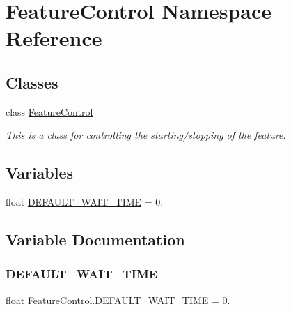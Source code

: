 \hypertarget{namespaceFeatureControl}{}\section{Feature\+Control Namespace Reference}
\label{namespaceFeatureControl}
\subsection*{Classes}
\begin{DoxyCompactItemize}
\item 
class \hyperlink{classFeatureControl_1_1FeatureControl}{Feature\+Control}
\begin{DoxyCompactList}\small\item\em This is a class for controlling the starting/stopping of the feature. \end{DoxyCompactList}\end{DoxyCompactItemize}
\subsection*{Variables}
\begin{DoxyCompactItemize}
\item 
float \hyperlink{namespaceFeatureControl_aeebd4e13e6a3a0dde7d720af530ae36d}{D\+E\+F\+A\+U\+L\+T\+\_\+\+W\+A\+I\+T\+\_\+\+T\+I\+ME} = 0.
\end{DoxyCompactItemize}


\subsection{Variable Documentation}
\mbox{\label{namespaceFeatureControl_aeebd4e13e6a3a0dde7d720af530ae36d}} 
\subsubsection{\texorpdfstring{D\+E\+F\+A\+U\+L\+T\+\_\+\+W\+A\+I\+T\+\_\+\+T\+I\+ME}{DEFAULT\_WAIT\_TIME}}
{\footnotesize\ttfamily float Feature\+Control.\+D\+E\+F\+A\+U\+L\+T\+\_\+\+W\+A\+I\+T\+\_\+\+T\+I\+ME = 0.}

